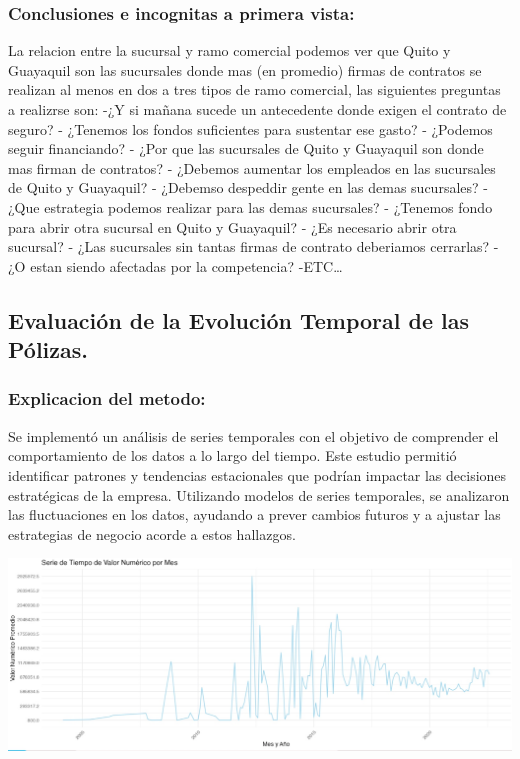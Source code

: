 \documentclass[
]{article}
\begin{document}
\subsubsection{Conclusiones e incognitas a primera
vista:}\label{conclusiones-e-incognitas-a-primera-vista}

La relacion entre la sucursal y ramo comercial podemos ver que Quito y
Guayaquil son las sucursales donde mas (en promedio) firmas de contratos
se realizan al menos en dos a tres tipos de ramo comercial, las
siguientes preguntas a realizrse son: -¿Y si mañana sucede un
antecedente donde exigen el contrato de seguro? - ¿Tenemos los fondos
suficientes para sustentar ese gasto? - ¿Podemos seguir financiando? -
¿Por que las sucursales de Quito y Guayaquil son donde mas firman de
contratos? - ¿Debemos aumentar los empleados en las sucursales de Quito
y Guayaquil? - ¿Debemso despeddir gente en las demas sucursales? - ¿Que
estrategia podemos realizar para las demas sucursales? - ¿Tenemos fondo
para abrir otra sucursal en Quito y Guayaquil? - ¿Es necesario abrir
otra sucursal? - ¿Las sucursales sin tantas firmas de contrato
deberiamos cerrarlas? -¿O estan siendo afectadas por la competencia?
-ETC\ldots{}

\subsection{Evaluación de la Evolución Temporal de las
Pólizas.}\label{evaluaciuxf3n-de-la-evoluciuxf3n-temporal-de-las-puxf3lizas.}

\subsubsection{Explicacion del metodo:}\label{explicacion-del-metodo-1}

Se implementó un análisis de series temporales con el objetivo de
comprender el comportamiento de los datos a lo largo del tiempo. Este
estudio permitió identificar patrones y tendencias estacionales que
podrían impactar las decisiones estratégicas de la empresa. Utilizando
modelos de series temporales, se analizaron las fluctuaciones en los
datos, ayudando a prever cambios futuros y a ajustar las estrategias de
negocio acorde a estos hallazgos.

\includegraphics{PHOTO-2024-06-13-15-10-27.jpg}
\end{document}
